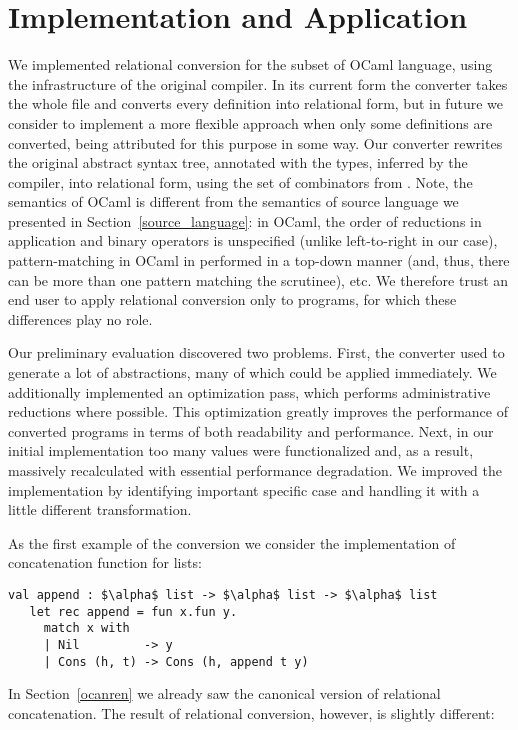 \section{Implementation and Application}
\label{evaluation}

We implemented relational conversion for the subset of OCaml language, using the infrastructure of the 
original compiler. In its current form the converter takes the whole file and converts every definition into relational form, 
but in future we consider to implement a more flexible approach when only some definitions are converted, being attributed
for this purpose in some way. Our converter rewrites the original abstract syntax tree, annotated with the types, inferred by the compiler, 
into relational form, using the set of combinators from \ocanren. Note, the semantics of OCaml is different from the 
semantics of source language we presented in Section~\ref{source_language}: in OCaml, the order of reductions in
application and binary operators is unspecified (unlike left-to-right in our case), pattern-matching in
OCaml in performed in a top-down manner (and, thus, there can be more than one pattern matching the scrutinee), etc. We
therefore trust an end user to apply relational conversion only to programs, for which these differences play
no role.

Our preliminary evaluation discovered two problems. First, the converter used to generate a lot of abstractions, 
many of which could be applied immediately. We additionally implemented an optimization pass, which performs 
administrative reductions where possible. This optimization greatly improves the performance of converted 
programs in terms of both readability and performance. Next, in our initial implementation too many values were
functionalized and, as a result, massively recalculated with essential performance degradation. We improved
the implementation by identifying important specific case and handling it with a little different 
transformation.

As the first example of the conversion we consider the implementation of concatenation function for lists:

\begin{lstlisting}[basicstyle=\small]
   val append : $\alpha$ list -> $\alpha$ list -> $\alpha$ list
   let rec append = fun x.fun y.
     match x with
     | Nil         -> y
     | Cons (h, t) -> Cons (h, append t y)
\end{lstlisting}

In Section~\ref{ocanren} we already saw the canonical version of relational concatenation. The result of relational conversion, however,
is slightly different:

